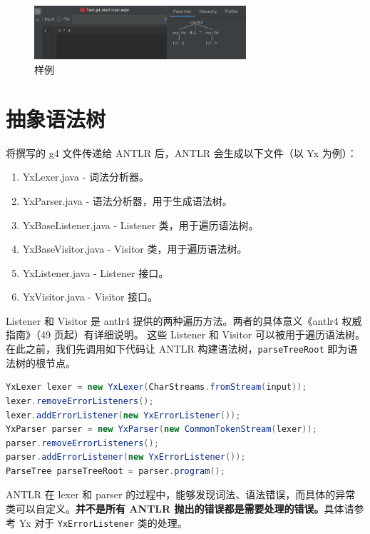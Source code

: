 \begin{figure}[htbp]
    \centering
    \includegraphics[width=0.7\textwidth]{image/g4.png}
    \caption{样例}
\end{figure}

\section{抽象语法树}

将撰写的 g4 文件传递给 ANTLR 后，ANTLR 会生成以下文件（以 Yx 为例）：
\begin{enumerate}
    \item YxLexer.java - 词法分析器。
    \item YxParser.java - 语法分析器，用于生成语法树。
    \item YxBaseListener.java - Listener 类，用于遍历语法树。
    \item YxBaseVisitor.java - Visitor 类，用于遍历语法树。
    \item YxListener.java - Listener 接口。
    \item YxVisitor.java - Visitor 接口。
\end{enumerate}
Listener 和 Visitor 是 antlr4 提供的两种遍历方法。两者的具体意义《antlr4 权威指南》（49 页起）有详细说明。
这些 Listener 和 Visitor 可以被用于遍历语法树。在此之前，我们先调用如下代码让 ANTLR 构建语法树，\texttt{parseTreeRoot}
即为语法树的根节点。
\begin{lstlisting}[language=Java]
YxLexer lexer = new YxLexer(CharStreams.fromStream(input));
lexer.removeErrorListeners();
lexer.addErrorListener(new YxErrorListener());
YxParser parser = new YxParser(new CommonTokenStream(lexer));
parser.removeErrorListeners();
parser.addErrorListener(new YxErrorListener());
ParseTree parseTreeRoot = parser.program();
\end{lstlisting}

\begin{remark}
    ANTLR 在 lexer 和 parser 的过程中，能够发现词法、语法错误，而具体的异常类可以自定义。\textbf{并不是所有 ANTLR 抛出的错误都是需要处理的错误。}具体请参考 Yx 对于 \texttt{YxErrorListener} 类的处理。
\end{remark}

